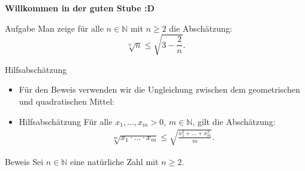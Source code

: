 \documentclass[10pt]{beamer}
\title{}
\author{Artur's Mathematikstübchen}
\date{}
\def\bN{\mathbb{N}}
\begin{document}

\begin{frame}
    \begin{center}
        \textbf{\huge Willkommen in der guten Stube \newline \newline :D}
    \end{center}
\end{frame}




\begin{frame}{}
    \begin{alertblock}{Aufgabe}
        Man zeige für alle \( n \in \bN \) mit \( n \geq 2 \) die Abschätzung:
        \begin{equation}
            \sqrt[n]{n}
        	\leq \sqrt{3 - \frac{2}{n}}.
        \end{equation}
    \end{alertblock}
\end{frame}



\begin{frame}{Hilfsabschätzung}
    \begin{itemize}
        \item<1->  Für den Beweis verwenden wir die Ungleichung zwischen dem geometrischen und quadratischen Mittel:   
        \item<2-> 
        \begin{block}{Hilfsabschätzung}
             Für alle \( x_{1}, \ldots, x_{m} > 0 \), \( m \in \bN \), gilt die Abschätzung:
             \begin{align*}
                \sqrt[m]{x_{1} \cdot \ldots \cdot x_{m}} 
                \leq \sqrt{\frac{x_{1}^{2} + \ldots + x_{m}^{2}}{m}}.
             \end{align*}
        \end{block} 
    \end{itemize}
\end{frame}



\begin{frame}{Beweis}
    Sei \( n \in \bN \) eine natürliche Zahl mit \( n \geq 2 \).
\end{frame}
\end{document}
